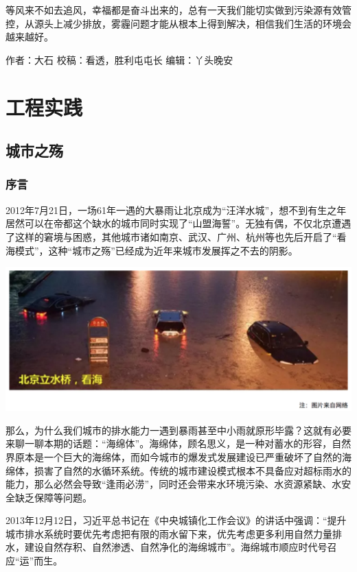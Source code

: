 \documentclass[]{book}
\begin{document}
等风来不如去追风，幸福都是奋斗出来的，总有一天我们能切实做到污染源有效管控，从源头上减少排放，雾霾问题才能从根本上得到解决，相信我们生活的环境会越来越好。

作者：大石 校稿：看透，胜利屯屯长 编辑：丫头晚安

\chapter{工程实践}

\section{城市之殇}

\subsection{序言}

2012年7月21日，一场61年一遇的大暴雨让北京成为``汪洋水城''，想不到有生之年居然可以在帝都这个缺水的城市同时实现了``山盟海誓''。无独有偶，不仅北京遭遇了这样的窘境与困惑，其他城市诸如南京、武汉、广州、杭州等也先后开启了``看海模式''，这种``城市之殇''已经成为近年来城市发展挥之不去的阴影。

\includegraphics[width=6.67in]{images/ch1}

那么，为什么我们城市的排水能力一遇到暴雨甚至中小雨就原形毕露？这就有必要来聊一聊本期的话题：``海绵体''。海绵体，顾名思义，是一种对蓄水的形容，自然界原本是一个巨大的海绵体，而如今城市的爆发式发展建设已严重破坏了自然的海绵体，损害了自然的水循环系统。传统的城市建设模式根本不具备应对超标雨水的能力，那么必然会导致``逢雨必涝''，同时还会带来水环境污染、水资源紧缺、水安全缺乏保障等问题。

2013年12月12日，习近平总书记在《中央城镇化工作会议》的讲话中强调：``提升城市排水系统时要优先考虑把有限的雨水留下来，优先考虑更多利用自然力量排水，建设自然存积、自然渗透、自然净化的海绵城市''。海绵城市顺应时代号召应``运''而生。
\end{document}
